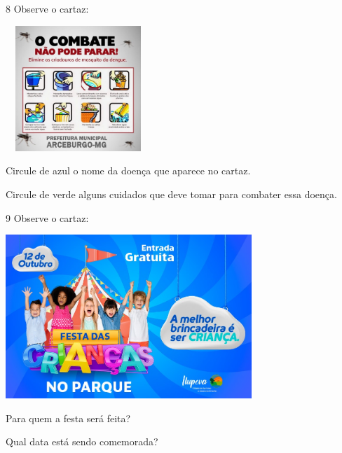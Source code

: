 \num{8} Observe o cartaz:

\includegraphics[width=2.15306in,height=1.86730in]{media/image134.jpeg}


\begin{escolha}
\item Circule de azul o nome da doença que aparece no cartaz.

\item Circule de verde alguns cuidados que deve tomar para combater essa doença.
\end{escolha}

\num{9} Observe o cartaz:

\includegraphics[width=3.66026in,height=2.43572in]{media/image135.jpeg}


\begin{escolha}
\item Para quem a festa será feita?


\item Qual data está sendo comemorada?

\end{escolha}

